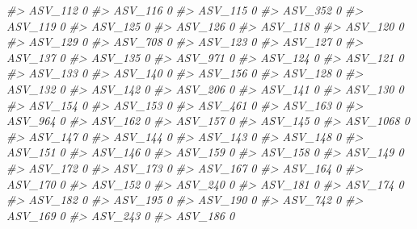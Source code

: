\documentclass[
]{article}
\newenvironment{Shaded}{\begin{snugshade}}{\end{snugshade}}
\newcommand{\CommentTok}[1]{\textcolor[rgb]{0.56,0.35,0.01}{\textit{#1}}}
\begin{document}
\begin{Shaded}
\begin{Highlighting}[]
\CommentTok{\#\textgreater{} ASV\_112   0}
\CommentTok{\#\textgreater{} ASV\_116   0}
\CommentTok{\#\textgreater{} ASV\_115   0}
\CommentTok{\#\textgreater{} ASV\_352   0}
\CommentTok{\#\textgreater{} ASV\_119   0}
\CommentTok{\#\textgreater{} ASV\_125   0}
\CommentTok{\#\textgreater{} ASV\_126   0}
\CommentTok{\#\textgreater{} ASV\_118   0}
\CommentTok{\#\textgreater{} ASV\_120   0}
\CommentTok{\#\textgreater{} ASV\_129   0}
\CommentTok{\#\textgreater{} ASV\_708   0}
\CommentTok{\#\textgreater{} ASV\_123   0}
\CommentTok{\#\textgreater{} ASV\_127   0}
\CommentTok{\#\textgreater{} ASV\_137   0}
\CommentTok{\#\textgreater{} ASV\_135   0}
\CommentTok{\#\textgreater{} ASV\_971   0}
\CommentTok{\#\textgreater{} ASV\_124   0}
\CommentTok{\#\textgreater{} ASV\_121   0}
\CommentTok{\#\textgreater{} ASV\_133   0}
\CommentTok{\#\textgreater{} ASV\_140   0}
\CommentTok{\#\textgreater{} ASV\_156   0}
\CommentTok{\#\textgreater{} ASV\_128   0}
\CommentTok{\#\textgreater{} ASV\_132   0}
\CommentTok{\#\textgreater{} ASV\_142   0}
\CommentTok{\#\textgreater{} ASV\_206   0}
\CommentTok{\#\textgreater{} ASV\_141   0}
\CommentTok{\#\textgreater{} ASV\_130   0}
\CommentTok{\#\textgreater{} ASV\_154   0}
\CommentTok{\#\textgreater{} ASV\_153   0}
\CommentTok{\#\textgreater{} ASV\_461   0}
\CommentTok{\#\textgreater{} ASV\_163   0}
\CommentTok{\#\textgreater{} ASV\_964   0}
\CommentTok{\#\textgreater{} ASV\_162   0}
\CommentTok{\#\textgreater{} ASV\_157   0}
\CommentTok{\#\textgreater{} ASV\_145   0}
\CommentTok{\#\textgreater{} ASV\_1068  0}
\CommentTok{\#\textgreater{} ASV\_147   0}
\CommentTok{\#\textgreater{} ASV\_144   0}
\CommentTok{\#\textgreater{} ASV\_143   0}
\CommentTok{\#\textgreater{} ASV\_148   0}
\CommentTok{\#\textgreater{} ASV\_151   0}
\CommentTok{\#\textgreater{} ASV\_146   0}
\CommentTok{\#\textgreater{} ASV\_159   0}
\CommentTok{\#\textgreater{} ASV\_158   0}
\CommentTok{\#\textgreater{} ASV\_149   0}
\CommentTok{\#\textgreater{} ASV\_172   0}
\CommentTok{\#\textgreater{} ASV\_173   0}
\CommentTok{\#\textgreater{} ASV\_167   0}
\CommentTok{\#\textgreater{} ASV\_164   0}
\CommentTok{\#\textgreater{} ASV\_170   0}
\CommentTok{\#\textgreater{} ASV\_152   0}
\CommentTok{\#\textgreater{} ASV\_240   0}
\CommentTok{\#\textgreater{} ASV\_181   0}
\CommentTok{\#\textgreater{} ASV\_174   0}
\CommentTok{\#\textgreater{} ASV\_182   0}
\CommentTok{\#\textgreater{} ASV\_195   0}
\CommentTok{\#\textgreater{} ASV\_190   0}
\CommentTok{\#\textgreater{} ASV\_742   0}
\CommentTok{\#\textgreater{} ASV\_169   0}
\CommentTok{\#\textgreater{} ASV\_243   0}
\CommentTok{\#\textgreater{} ASV\_186   0}

\end{Highlighting}
\end{Shaded}
\end{document}
